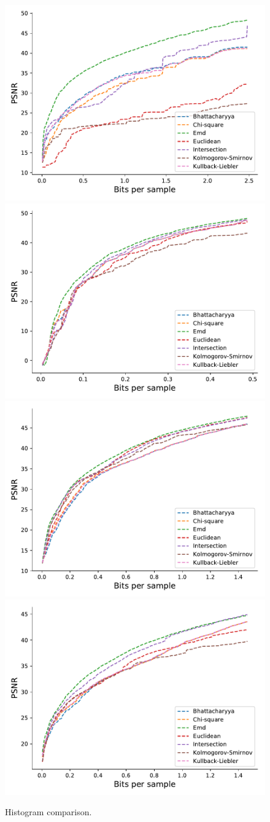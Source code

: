 \begin{figure}
	\centering
	{\includegraphics[width=0.48\linewidth]{img/histogram/different-metrics/boiler-histogram-metrics.pdf}}
	{\includegraphics[width=0.48\linewidth]{img/histogram/different-metrics/kflame-histogram-metrics.pdf}}
	{\includegraphics[width=0.48\linewidth]{img/histogram/different-metrics/miranda-diffusivity-histogram-metrics.pdf}}
	{\includegraphics[width=0.48\linewidth]{img/histogram/different-metrics/turbulence-histogram-metrics.pdf}}
	\caption{Histogram comparison.}
	\label{fig:histogram-metrics-comparison}
\end{figure}

